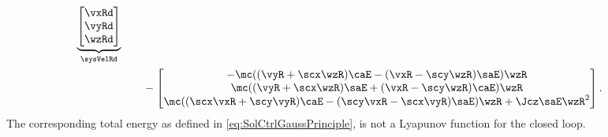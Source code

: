 \begin{subequations}
\begin{align}
 \underbrace{\begin{bmatrix} \vxRd \\ \vyRd \\ \wzRd \end{bmatrix}}_{\sysVelRd}
\nonumber\\
 &\qquad- 
 \begin{bmatrix} -\mc((\vyR + \scx\wzR)\caE - (\vxR-\scy\wzR)\saE) \wzR \\ \mc((\vyR + \scx\wzR)\saE + (\vxR-\scy\wzR)\caE) \wzR \\ \mc((\scx\vxR+\scy\vyR)\caE - (\scy\vxR-\scx\vyR)\saE)\wzR + \Jcz\saE\wzR^2 \end{bmatrix}.
\end{align}
\end{subequations}
The corresponding total energy as defined in \eqref{eq:SolCtrlGaussPrinciple}, is not a Lyapunov function for the closed loop. 

